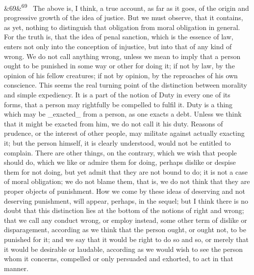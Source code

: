 \documentclass[12pt]{article}
\newcommand{\para}[1][]{\par\noindent\ifx&#1&\else\textsuperscript{\footnotesize #1}~\fi}
\begin{document}
\para[69] The above is, I think, a true account, as far as it goes, of the origin and progressive growth of the idea of justice. But we must observe, that it contains, as yet, nothing to distinguish that obligation from moral obligation in general. For the truth is, that the idea of penal sanction, which is the essence of law, enters not only into the conception of injustice, but into that of any kind of wrong. We do not call anything wrong, unless we mean to imply that a person ought to be punished in some way or other for doing it; if not by law, by the opinion of his fellow creatures; if not by opinion, by the reproaches of his own conscience. This seems the real turning point of the distinction between morality and simple expediency. It is a part of the notion of Duty in every one of its forms, that a person may rightfully be compelled to fulfil it. Duty is a thing which may be \_exacted\_ from a person, as one exacts a debt. Unless we think that it might be exacted from him, we do not call it his duty. Reasons of prudence, or the interest of other people, may militate against actually exacting it; but the person himself, it is clearly understood, would not be entitled to complain. There are other things, on the contrary, which we wish that people should do, which we like or admire them for doing, perhaps dislike or despise them for not doing, but yet admit that they are not bound to do; it is not a case of moral obligation; we do not blame them, that is, we do not think that they are proper objects of punishment. How we come by these ideas of deserving and not deserving punishment, will appear, perhaps, in the sequel; but I think there is no doubt that this distinction lies at the bottom of the notions of right and wrong; that we call any conduct wrong, or employ instead, some other term of dislike or disparagement, according as we think that the person ought, or ought not, to be punished for it; and we say that it would be right to do so and so, or merely that it would be desirable or laudable, according as we would wish to see the person whom it concerns, compelled or only persuaded and exhorted, to act in that manner.
\end{document}

